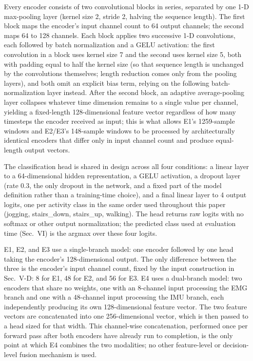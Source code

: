 \documentclass[conference]{IEEEtran}
\begin{document}
Every encoder consists of two convolutional blocks in series,
separated by one 1-D max-pooling layer (kernel size 2, stride 2,
halving the sequence length). The first block maps the encoder's
input channel count to 64 output channels; the second maps 64 to
128 channels. Each block applies two successive 1-D convolutions,
each followed by batch normalization and a GELU activation: the
first convolution in a block uses kernel size 7 and the second uses
kernel size 5, both with padding equal to half the kernel size (so
that sequence length is unchanged by the convolutions themselves;
length reduction comes only from the pooling layers), and both omit
an explicit bias term, relying on the following batch-normalization
layer instead. After the second block, an adaptive average-pooling
layer collapses whatever time dimension remains to a single value
per channel, yielding a fixed-length 128-dimensional feature vector
regardless of how many timesteps the encoder received as input; this
is what allows E1's 1259-sample windows and E2/E3's 148-sample
windows to be processed by architecturally identical encoders that
differ only in input channel count and produce equal-length output
vectors.

The classification head is shared in design across all four
conditions: a linear layer to a 64-dimensional hidden representation,
a GELU activation, a dropout layer (rate 0.3, the only dropout in
the network, and a fixed part of the model definition rather than a
training-time choice), and a final linear layer to 4 output logits,
one per activity class in the same order used throughout this paper
(jogging, stairs\_down, stairs\_up, walking). The head returns raw
logits with no softmax or other output normalization; the predicted
class used at evaluation time (Sec.~VI) is the argmax over these
four logits.

E1, E2, and E3 use a single-branch model: one encoder followed by
one head taking the encoder's 128-dimensional output. The only
difference between the three is the encoder's input channel count,
fixed by the input construction in Sec.~V-D: 8 for E1, 48 for E2,
and 56 for E3. E4 uses a dual-branch model: two encoders that share
no weights, one with an 8-channel input processing the EMG branch
and one with a 48-channel input processing the IMU branch, each
independently producing its own 128-dimensional feature vector. The
two feature vectors are concatenated into one 256-dimensional
vector, which is then passed to a head sized for that width. This
channel-wise concatenation, performed once per forward pass after
both encoders have already run to completion, is the only point at
which E4 combines the two modalities; no other feature-level or
decision-level fusion mechanism is used.
\end{document}
